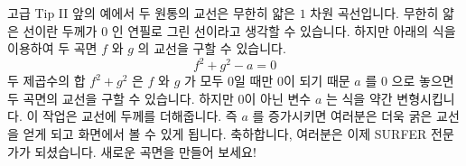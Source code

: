 \begin{surferPage}{고급 Tip II}
앞의 예에서 두 원통의 교선은 무한히 얇은 $1$ 차원 곡선입니다. 무한히 얇은 선이란 두께가 $0$ 인 연필로 그린 선이라고 생각할 수 있습니다. 하지만 아래의 식을 이용하여 두 곡면 $f$ 와 $g$ 의 교선을 구할 수 있습니다. 
\[ f^2+g^2-a=0\]
두 제곱수의 합 $f^2+g^2$ 은 $f$ 와 $g$ 가 모두 0일 때만 0이 되기 때문 $a$ 를 $0$ 으로 놓으면 두 곡면의 교선을 구할 수 있습니다. 하지만 0이 아닌 변수 $a$ 는 식을 약간 변형시킵니다. 이 작업은 교선에 두께를 더해줍니다. 즉 $a$ 를 증가시키면 여러분은 더욱 굵은 교선을 얻게 되고 화면에서 볼 수 있게 됩니다. 
\newline \newline
축하합니다, 여러분은 이제 SURFER 전문가가 되셨습니다. 새로운 곡면을 만들어 보세요!
\end{surferPage}
